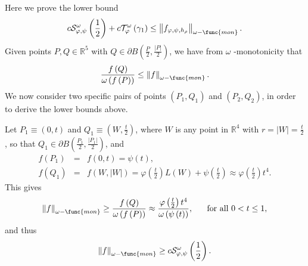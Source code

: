 \documentclass{amsart}
\theoremstyle{plain}
\numberwithin{equation}{section}
\begin{document}
Here we prove the lower bound 
\begin{equation*}
c\mathcal{S}_{\varphi ,\psi }^{\omega }\left( \frac{1}{2}\right) +c\mathcal{T%
}_{\varphi }^{\omega }\left( \gamma _{1}\right) \leq \left\Vert f_{\varphi
,\psi ,h_{\rho }}\right\Vert _{\omega -\func{mon}}.
\end{equation*}%
Given points $P,Q\in \mathbb{R}^{5}$ with $Q\in \partial B\left( \frac{P}{2},%
\frac{\left\vert P\right\vert }{2}\right) $, we have from $\omega $
-monotonicity that 
\begin{equation*}
\frac{f\left( Q\right) }{\omega \left( f\left( P\right) \right) }\leq
\left\Vert f\right\Vert _{\omega -\func{mon}}.
\end{equation*}%
We now consider two specific pairs of points $\left( P_{1},Q_{1}\right) $
and $\left( P_{2},Q_{2}\right) $, in order to derive the lower bounds above.

Let $P_{1}\equiv \left( 0,t\right) $ and $Q_{1}\equiv \left( W,\frac{t}{2}%
\right) $, where $W$ is any point in $\mathbb{R}^{4}$ with $r=\left\vert
W\right\vert =\frac{t}{2}$, so that $Q_{1}\in \partial B\left( \frac{P_{1}}{2%
},\frac{\left\vert P_{1}\right\vert }{2}\right) $, and 
\begin{eqnarray*}
f\left( P_{1}\right) &=&f\left( 0,t\right) =\psi \left( t\right) , \\
f\left( Q_{1}\right) &=&f\left( W,\left\vert W\right\vert \right) =\varphi
\left( \frac{t}{2}\right) L\left( W\right) +\psi \left( \frac{t}{2}\right)
\approx \varphi \left( \frac{t}{2}\right) t^{4}.
\end{eqnarray*}%
This gives 
\begin{equation*}
\left\Vert f\right\Vert _{\omega -\func{mon}}\geq \frac{f\left( Q\right) }{%
\omega \left( f\left( P\right) \right) }\approx \frac{\varphi \left( \frac{t%
}{2}\right) t^{4}}{\omega \left( \psi \left( t\right) \right) },\ \ \ \ \ 
\text{for all }0<t\leq 1,
\end{equation*}%
and thus 
\begin{equation*}
\left\Vert f\right\Vert _{\omega -\func{mon}}\geq c\mathcal{S}_{\varphi
,\psi }^{\omega }\left( \frac{1}{2}\right) .
\end{equation*}
\end{document}

